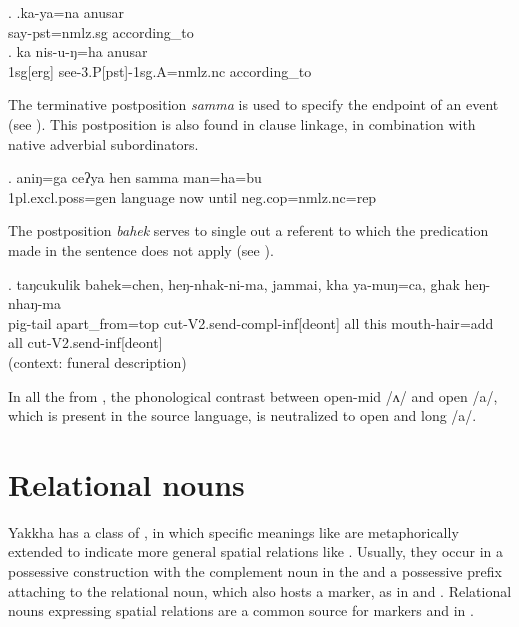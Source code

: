 \ex. \ag.ka-ya=na                   anusar\\
say{\sc [3sg]-pst=nmlz.sg} according\_to\\
 
\bg.  ka       nis-u-ŋ=ha                                  anusar\\
{\sc 1sg[erg]} see{\sc -3.P[pst]-1sg.A=nmlz.nc} according\_to\\
 

The terminative postposition \emph{samma}   is used to specify the endpoint of an event (see \Next). This postposition is also found in clause linkage, in combination with native adverbial subordinators.

\exg. aniŋ=ga            ceʔya   hen samma      man=ha=bu\\
{\sc 1pl.excl.poss=gen}  language now until {\sc neg.cop=nmlz.nc=rep}\\
 

The  postposition \emph{bahek}   serves to single out a referent to which the predication made in the sentence does not apply (see \Next). 

\exg. taŋcukulik bahek=chen,       heŋ-nhak-ni-ma,                       jammai, kha  ya-muŋ=ca,       ghak heŋ-nhaŋ-ma\\
pig-tail apart\_from{\sc =top} cut{\sc -V2.send-compl-inf[deont]} all this mouth-hair{\sc =add} all cut{\sc -V2.send-inf[deont]} \\
 (context: funeral description) 


In all the  from , the phonological contrast between open-mid /ʌ/ and open /a/, which is present in the source language, is neutralized to open and long /a/.

 
\section{Relational nouns}\label{postpos-2}
  
  Yakkha has a class of , in which  specific meanings like  are metaphorically extended to indicate more general spatial relations like . Usually, they occur in a possessive construction with the complement noun in the  and a possessive prefix attaching to the relational noun, which also hosts a   marker, as in  \Next[a] and \Next[b]. Relational nouns expressing spatial relations are a common source for  markers and  in  \citep[62]{DeLancey1985_Etymological}.
  
